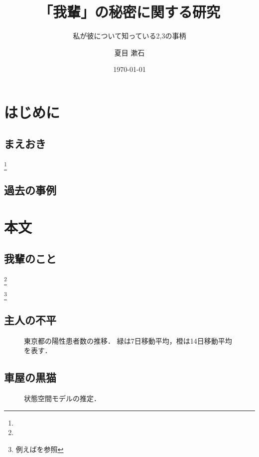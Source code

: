 \documentclass[
  leqno,
  twoside,
  numbers=noenddot,
]{scrbook}
\title{「我輩」の秘密に関する研究}
\subtitle{私が彼について知っている2,3の事柄}
\author{夏目 漱石}
\date{\today}
\begin{document}
\frontmatter
\maketitle
\tableofcontents

\mainmatter
\chapter{はじめに}

\section{まえおき}
\footnote{}

\section{過去の事例}
\blindmathpaper 

\chapter{本文}

\section{我輩のこと}
\footnote{}

\footnote{例えば\cite{吉田2006,竹内1963,杉浦1980,杉浦1985,田中2006}を参照}

\section{主人の不平}
\begin{figure}[htbp] %
  \centering
  \myGraph[1]{} %
  \caption{東京都の陽性患者数の推移．
    緑は7日移動平均，橙は14日移動平均を表す．
    \label{fig:1}}
\end{figure}

\section{車屋の黒猫}

\begin{figure} %
  \centering
  \caption{状態空間モデルの推定．
    \label{fig:2}}
\end{figure}
\end{document}
